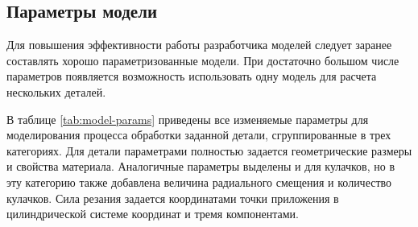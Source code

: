 \documentclass[14pt,oneside,final]{extreport}
\begin{document}
	\subsection{Параметры модели}
	Для повышения эффективности работы разработчика моделей следует заранее составлять хорошо параметризованные модели. При достаточно большом числе параметров появляется возможность использовать одну модель для расчета нескольких деталей.  
	
	В таблице \ref{tab:model-params} приведены все изменяемые параметры для моделирования процесса обработки заданной детали, сгруппированные в трех категориях. Для детали параметрами полностью задается геометрические размеры и свойства материала. Аналогичные параметры выделены и для кулачков, но в эту категорию также добавлена величина радиального смещения и количество кулачков. Сила резания задается координатами точки приложения в цилиндрической системе координат  и тремя компонентами. 
	
\end{document}
